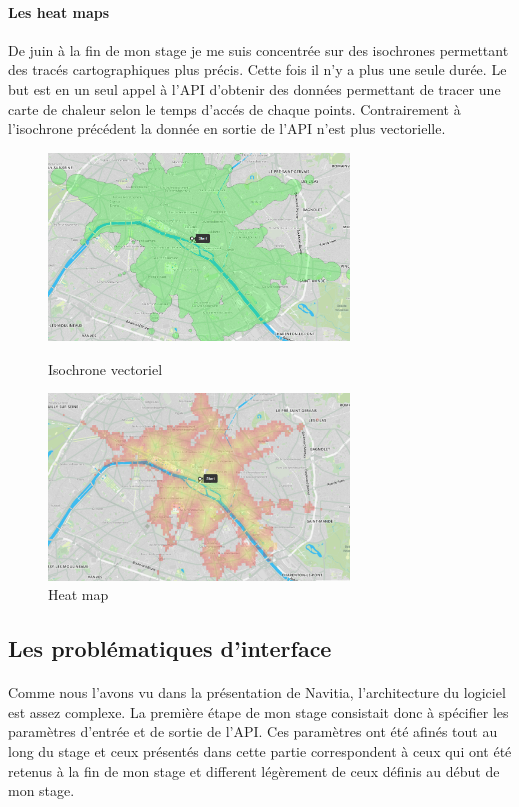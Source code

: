 \documentclass[a4paper]{report}
\begin{document}
\paragraph{Les  heat maps} De juin à la fin de mon stage je me suis concentrée sur des isochrones permettant des tracés cartographiques plus précis. Cette fois il n'y a plus une seule durée. Le but est en un seul appel à l'API d'obtenir des données permettant de tracer une carte de chaleur selon le temps d'accés de chaque points. Contrairement à l'isochrone précédent la donnée en sortie de l'API n'est plus vectorielle.

\begin{figure}[H]
	\begin{minipage}[c]{.46\linewidth}
		\includegraphics[width=8cm]{image/iso_vect}
       		\caption{Isochrone vectoriel}
		\label{Isochrone vectoriel}
	\end{minipage} \hfill
	\begin{minipage}[c]{.46\linewidth}
		\includegraphics[width=8cm]{image/heat_map}
       		\caption{Heat map}
		\label{Heat map}
	\end{minipage}
\end{figure}

\subsection{Les problématiques d'interface}

\paragraph{} Comme nous l'avons vu dans la présentation de Navitia, l'architecture du logiciel est assez complexe. La première étape de mon stage consistait donc à spécifier les paramètres d'entrée et de sortie de l'API. Ces paramètres ont été afinés tout au long du stage et ceux présentés dans cette partie correspondent à ceux qui ont été retenus à la fin de mon stage et different légèrement de ceux définis au début de mon stage. 
\end{document}
